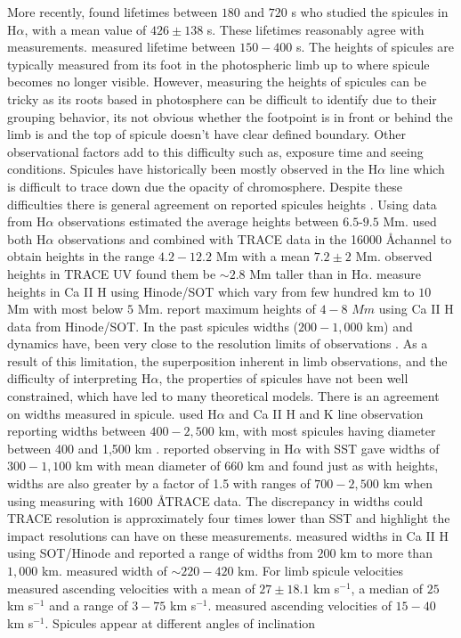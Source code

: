 \documentclass[12pt]{ociamthesis}
\begin{document}
More recently, \cite{Pasachoff2009SoPh26059P} found lifetimes between $180$ and $720$ s who studied the spicules in H$\alpha$, with a mean value of $426\pm138$ s. These lifetimes reasonably agree with \cite{Pontieu2007PASJ} measurements. \cite{Pereira2012} measured lifetime between $150-400$ s. The heights of spicules are typically measured from its foot in the photospheric limb up to where spicule becomes no longer visible. However, measuring the heights of spicules can be tricky as its roots based in photosphere can be difficult to identify due to their grouping behavior, its not obvious whether the footpoint is in front or behind the limb is  and the top of spicule doesn't have clear defined boundary. Other observational factors add to this difficulty such as, exposure time and seeing conditions. Spicules have historically been mostly observed in the H$\alpha$ line which is difficult to trace down due the opacity of chromosphere. Despite these difficulties there is general agreement on reported spicules heights \cite{Tsiropoula2012}. Using data from H$\alpha$ observations \cite{Beckers1972ARA&A,Beckers1968} estimated the average heights between $6.5$-$9.5$ Mm. \cite{Pasachoff2009SoPh26059P} used both H$\alpha$ observations and combined with TRACE data in the 16000 \AA channel to obtain heights in the range $4.2-12.2$ Mm with a mean $7.2\pm2$ Mm. \cite{Pasachoff2009SoPh26059P} observed heights in TRACE UV found them be $\sim 2.8$ Mm taller than in H$\alpha$. \cite{Pontieu2007PASJ} measure heights in Ca II H using Hinode/SOT which vary from few hundred km to $10$ Mm with most below $5$ Mm. \cite{Pereira2012} report maximum heights of $4-8$ $Mm$ using Ca II H data from Hinode/SOT. In the past spicules widths ($200-1,000$ km) and dynamics have, been very close to the resolution limits of observations \citep{Pontieu2007ASPC}. As a result of this limitation, the superposition inherent in limb observations, and the difficulty of interpreting H${\alpha}$, the properties of spicules have not been well constrained, which have led to many theoretical models. There is an agreement on widths measured in spicule. \cite{Beckers1972ARA&A,Beckers1968} used H$\alpha$ and Ca II H and K line observation reporting widths between $400-2,500$ km, with most spicules having diameter between  400 and 1,500 km \cite{Lynch1973SoPh3063L,Dunn1960Obs8031D}. \cite{Pasachoff2009SoPh26059P} reported observing in H$\alpha$ with SST gave widths of $300-1,100$ km with mean diameter of $660$ km and found just as with heights, widths are also greater by a factor of 1.5 with ranges of $700-2,500$ km when using measuring with 1600 \AA TRACE data. The discrepancy in widths could TRACE resolution is approximately four times lower than SST and highlight the impact resolutions can have on these measurements. \cite{Tavabi2011NewA16296T} measured widths in Ca II H using SOT/Hinode and reported a range of widths from $200$ km to more than $1,000$ km. \cite{Pereira2012} measured width of $\sim 220-420$ km. For limb spicule velocities \cite{Pasachoff2009SoPh26059P} measured ascending velocities with a mean of $27\pm18.1$ km s$^{-1}$, a median of $25$ km s$^{-1}$ and a range of $3-75$ km s$^{-1}$. \cite{Pereira2012} measured ascending velocities of $15-40$ km s$^{-1}$. Spicules appear at different angles of inclination 
\end{document}
